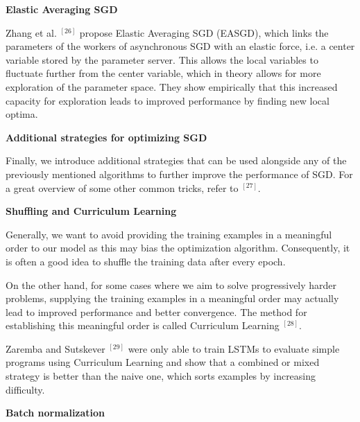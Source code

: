 \documentclass[4pt,journal,compsoc]{IEEEtran}
\begin{document}
\begin{flushleft}
    \textbf{\Large Elastic Averaging SGD} \newline
    
    Zhang et al. $^ {[26]}$ propose Elastic Averaging SGD (EASGD), which links the parameters of the workers of asynchronous SGD with an elastic force, i.e. a center variable stored by the parameter server. This allows the local variables to fluctuate further from the center variable, which in theory allows for more exploration of the parameter space. They show empirically that this increased capacity for exploration leads to improved performance by finding new local optima.\newline \newline
    
    \textbf{\Large Additional strategies for optimizing SGD} \newline
    \label{sec:strategies}
    
    Finally, we introduce additional strategies that can be used alongside any of the previously mentioned algorithms to further improve the performance of SGD. For a great overview of some other common tricks, refer to $^ {[27]}$. \newline \newline
    
    \textbf{\Large Shuffling and Curriculum Learning} \newline
    \label{sec:shuffling}
    
    Generally, we want to avoid providing the training examples in a meaningful order to our model as this may bias the optimization algorithm. Consequently, it is often a good idea to shuffle the training data after every epoch. \newline
    
    On the other hand, for some cases where we aim to solve progressively harder problems, supplying the training examples in a meaningful order may actually lead to improved performance and better convergence. The method for establishing this meaningful order is called Curriculum Learning $^ {[28]}$. \newline
    
    Zaremba and Sutskever $^ {[29]}$ were only able to train LSTMs to evaluate simple programs using Curriculum Learning and show that a combined or mixed strategy is better than the naive one, which sorts examples by increasing difficulty. \newline \newline
    
    \textbf{\Large Batch normalization} \newline
    

\end{flushleft}
\end{document}

